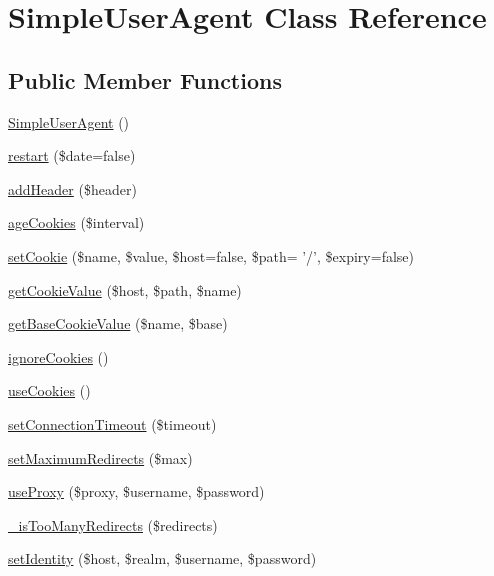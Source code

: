 \hypertarget{class_simple_user_agent}{
\section{SimpleUserAgent Class Reference}
\label{class_simple_user_agent}
}
\subsection*{Public Member Functions}
\begin{DoxyCompactItemize}
\item 
\hyperlink{class_simple_user_agent_a7514052c18df5e800786dbca132fd0f9}{SimpleUserAgent} ()
\item 
\hyperlink{class_simple_user_agent_a332656f2f3bab01a7a25c9ce28dc6995}{restart} (\$date=false)
\item 
\hyperlink{class_simple_user_agent_afa939a53c88a70147c399dbc3c8b664c}{addHeader} (\$header)
\item 
\hyperlink{class_simple_user_agent_aba32355b5660f25d62ca0e92114c9879}{ageCookies} (\$interval)
\item 
\hyperlink{class_simple_user_agent_aca17a7847aedf88f1f0b75adbf708cc8}{setCookie} (\$name, \$value, \$host=false, \$path= '/', \$expiry=false)
\item 
\hyperlink{class_simple_user_agent_a5036fd8466a5f4231bc2d9be29b47cff}{getCookieValue} (\$host, \$path, \$name)
\item 
\hyperlink{class_simple_user_agent_a4f6c882450bd4f5b89564dd468f95187}{getBaseCookieValue} (\$name, \$base)
\item 
\hyperlink{class_simple_user_agent_ab8a0d45899a60bb8b0f947ba3a9e9a91}{ignoreCookies} ()
\item 
\hyperlink{class_simple_user_agent_af43a334e83797817ba9b368a1d9f018a}{useCookies} ()
\item 
\hyperlink{class_simple_user_agent_ac7646142526e790424dbde1141c2ef5a}{setConnectionTimeout} (\$timeout)
\item 
\hyperlink{class_simple_user_agent_aa0040a11b72b187848479065f14eff27}{setMaximumRedirects} (\$max)
\item 
\hyperlink{class_simple_user_agent_aabde5dbb594c8c12756cf5b5a1732040}{useProxy} (\$proxy, \$username, \$password)
\item 
\hyperlink{class_simple_user_agent_a8004bb1aa6c9b9205ce8f5fc16acbdb3}{\_\-isTooManyRedirects} (\$redirects)
\item 
\hyperlink{class_simple_user_agent_a17aa7c374babcc447bfee05499abafb9}{setIdentity} (\$host, \$realm, \$username, \$password)

\end{DoxyCompactItemize}
